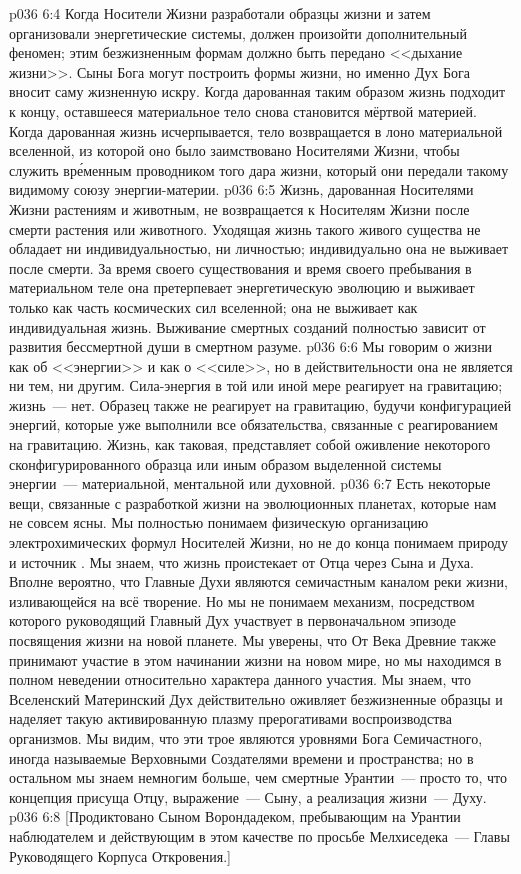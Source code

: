 \vs p036 6:4 \pc Когда Носители Жизни разработали образцы жизни и затем организовали энергетические системы, должен произойти дополнительный феномен; этим безжизненным формам должно быть передано <<дыхание жизни>>. Сыны Бога могут построить формы жизни, но именно Дух Бога вносит саму жизненную искру. Когда дарованная таким образом жизнь подходит к концу, оставшееся материальное тело снова становится мёртвой материей. Когда дарованная жизнь исчерпывается, тело возвращается в лоно материальной вселенной, из которой оно было заимствовано Носителями Жизни, чтобы служить вр\'еменным проводником того дара жизни, который они передали такому видимому союзу энергии\hyp{}материи.
\vs p036 6:5 Жизнь, дарованная Носителями Жизни растениям и животным, не возвращается к Носителям Жизни после смерти растения или животного. Уходящая жизнь такого живого существа не обладает ни индивидуальностью, ни личностью; индивидуально она не выживает после смерти. За время своего существования и время своего пребывания в материальном теле она претерпевает энергетическую эволюцию и выживает только как часть космических сил вселенной; она не выживает как индивидуальная жизнь. Выживание смертных созданий полностью зависит от развития бессмертной души в смертном разуме.
\vs p036 6:6 \pc Мы говорим о жизни как об <<энергии>> и как о <<силе>>, но в действительности она не является ни тем, ни другим. Сила\hyp{}энергия в той или иной мере реагирует на гравитацию; жизнь~--- нет. Образец также не реагирует на гравитацию, будучи конфигурацией энергий, которые уже выполнили все обязательства, связанные с реагированием на гравитацию. Жизнь, как таковая, представляет собой оживление некоторого сконфигурированного образца или иным образом выделенной системы энергии~--- материальной, ментальной или духовной.
\vs p036 6:7 \pc Есть некоторые вещи, связанные с разработкой жизни на эволюционных планетах, которые нам не совсем ясны. Мы полностью понимаем физическую организацию электрохимических формул Носителей Жизни, но не до конца понимаем природу и источник . Мы знаем, что жизнь проистекает от Отца через Сына и  Духа. Вполне вероятно, что Главные Духи являются семичастным каналом реки жизни, изливающейся на всё творение. Но мы не понимаем механизм, посредством которого руководящий Главный Дух участвует в первоначальном эпизоде посвящения жизни на новой планете. Мы уверены, что От Века Древние также принимают участие в этом начинании жизни на новом мире, но мы находимся в полном неведении относительно характера данного участия. Мы знаем, что Вселенский Материнский Дух действительно оживляет безжизненные образцы и наделяет такую активированную плазму прерогативами воспроизводства организмов. Мы видим, что эти трое являются уровнями Бога Семичастного, иногда называемые Верховными Создателями времени и пространства; но в остальном мы знаем немногим больше, чем смертные Урантии~--- просто то, что концепция присуща Отцу, выражение~--- Сыну, а реализация жизни~--- Духу.
\vsetoff
\vs p036 6:8 [Продиктовано Сыном Ворондадеком, пребывающим на Урантии наблюдателем и действующим в этом качестве по просьбе Мелхиседека~--- Главы Руководящего Корпуса Откровения.]
\quizlink
